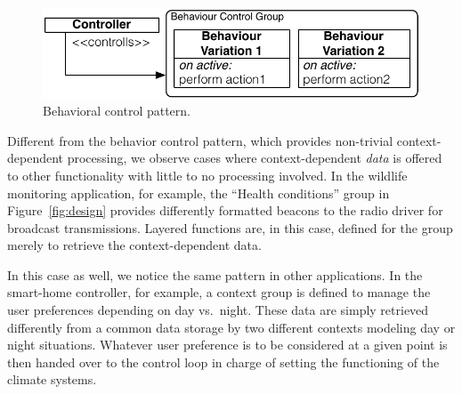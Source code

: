 \begin{figure}
\begin{center}
\includegraphics[scale=.5]{imgs/beh_var}
\vspace{-1mm}
\caption{Behavioral control pattern.}
  \label{fig:control}
\vspace{-8mm}
\end{center}
\end{figure}




 Different from the behavior control
pattern, which provides non-trivial context-dependent processing, we
observe cases where context-dependent \emph{data} is offered to other
functionality with little to no processing involved. In the wildlife
monitoring application, for example, the ``Health conditions'' group
in Figure~\ref{fig:design} provides differently formatted beacons to
the radio driver for broadcast transmissions. Layered functions are,
in this case, defined for the group merely to retrieve the
context-dependent data.

In this case as well, we notice the same pattern in other
applications. In the smart-home controller, for example, a context
group is defined to manage the user preferences depending on day vs.\
night. These data are simply retrieved differently from a common data
storage by two different contexts modeling day or night
situations. Whatever user preference is to be considered at a given
point is then handed over to the control loop in charge of setting the
functioning of the climate systems.

